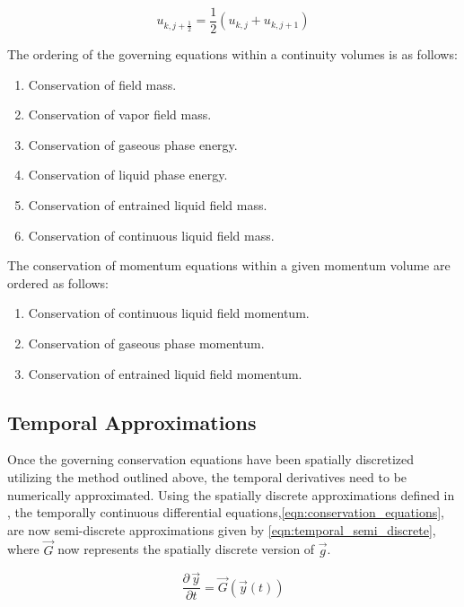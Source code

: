 \begin{equation}
\label{eqn:average_advecting_vel}
u_{k,j+\frac{1}{2}} = \frac{1}{2}\left(u_{k,j} + u_{k, j+1}\right)
\end{equation}

The ordering of the governing equations within a continuity volumes is as follows:

\begin{enumerate}
\item{Conservation of \ncg{} field mass.}
\item{Conservation of vapor field mass.}
\item{Conservation of gaseous phase energy.}
\item{Conservation of liquid phase energy.}
\item{Conservation of entrained liquid field mass.}
\item{Conservation of continuous liquid field mass.}
\end{enumerate}

The conservation of momentum equations within a given momentum volume are ordered as follows:

\begin{enumerate}
\item{Conservation of continuous liquid field momentum.}
\item{Conservation of gaseous phase momentum.}
\item{Conservation of entrained liquid field momentum.}
\end{enumerate}

\subsection{Temporal Approximations}
\label{subsect:temporal_approx}
Once the governing conservation equations have been spatially discretized utilizing the method outlined above, the temporal derivatives need to be numerically approximated.
Using the spatially discrete approximations defined in , the temporally continuous differential equations,\eqref{eqn:conservation_equations}, are now semi-discrete approximations given by \eqref{eqn:temporal_semi_discrete}, where $\vec{G}$ now represents the spatially discrete version of $\vec{g}$.

\begin{equation}
\label{eqn:temporal_semi_discrete}
\frac{\partial \,\vec{y} }{\partial t} = \vec{G}(\vec{y}(t))
\end{equation}

